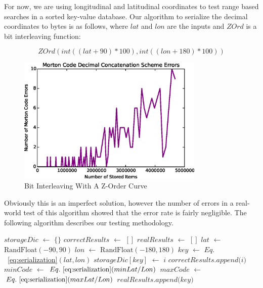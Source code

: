 \documentclass[10pt]{IEEEtran}
\newcommand*\Let[2]{\State #1 $\gets$ #2}
\newcommand*\Append[2]{\State #1$.append($#2$)$}
\begin{document}
\par For now, we are using longitudinal and latitudinal coordinates to test range based searches in a sorted key-value database. Our algorithm to serialize the decimal coordinates to bytes is as follows, where $lat$ and $lon$ are the inputs and $ZOrd$ is a bit interleaving function:

\begin{equation} \label{eq:serialization}
ZOrd(int((lat + 90) * 100), int((lon + 180) * 100))
\end{equation}

\begin{figure}[!t]
\centering
\includegraphics[width=3.5in]{errors.eps}
\caption{Bit Interleaving With A Z-Order Curve}
\label{fig_ZOrd}
\end{figure}

\par Obviously this is an imperfect solution, however the number of errors in a real-world test of this algorithm showed that the error rate is fairly negligible. The following algorithm describes our testing methodology.
\begin{algorithm}
  \begin{algorithmic}[1]
  \vspace{-0.4cm}
    \Statex
        \Let{$storageDic$}{$\{\}$}
        \Let{$correctResults$}{$[]$}
        \Let{$realResults$}{$[]$}
            \Let{$lat$}{$\textrm{RandFloat}(-90,90)$}
            \Let{$lon$}{$\textrm{RandFloat}(-180,180)$}
            \Let{$key$}{$Eq.$~\ref{eq:serialization}$(lat,lon)$}
            \Let{$storageDic[key]$}{$i$}
                \Append{$correctResults$}{$i$}
            \EndIf
        \EndFor
        \Let{$minCode$}{$Eq.~\ref{eq:serialization}(minLat/Lon)$}
        \Let{$maxCode$}{$Eq.~\ref{eq:serialization}(maxLat/Lon)$}
                \Append{$realResults$}{$key$}
            \EndIf
        \EndFor
        \State {}
        
    \EndFunction
  \end{algorithmic}
\end{algorithm}
\end{document}
